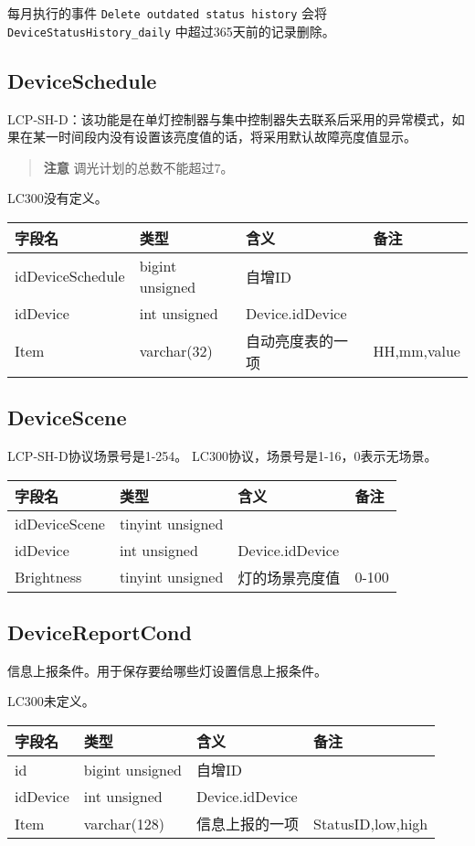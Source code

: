 每月执行的事件 \texttt{Delete outdated status history} 会将
\texttt{DeviceStatusHistory\_daily} 中超过365天前的记录删除。

\subsection{DeviceSchedule}\label{deviceschedule}

LCP-SH-D：该功能是在单灯控制器与集中控制器失去联系后采用的异常模式，如果在某一时间段内没有设置该亮度值的话，将采用默认故障亮度值显示。

\begin{quote}
\textbf{注意} 调光计划的总数不能超过7。
\end{quote}

LC300没有定义。

\begin{longtabu}[c]{@{}lXXX@{}}
\toprule
字段名 & 类型 & 含义 & 备注\tabularnewline
\midrule
\endhead
idDeviceSchedule & bigint unsigned & 自增ID &\tabularnewline
idDevice & int unsigned & Device.idDevice &\tabularnewline
Item & varchar(32) & 自动亮度表的一项 & HH,mm,value\tabularnewline
\bottomrule
\end{longtabu}

\subsection{DeviceScene}\label{devicescene}

LCP-SH-D协议场景号是1-254。 LC300协议，场景号是1-16，0表示无场景。

\begin{longtabu}[c]{@{}lXXX@{}}
\toprule
字段名 & 类型 & 含义 & 备注\tabularnewline
\midrule
\endhead
idDeviceScene & tinyint unsigned & &\tabularnewline
idDevice & int unsigned & Device.idDevice &\tabularnewline
Brightness & tinyint unsigned & 灯的场景亮度值 & 0-100\tabularnewline
\bottomrule
\end{longtabu}

\subsection{DeviceReportCond}\label{devicereportcond}

信息上报条件。用于保存要给哪些灯设置信息上报条件。

LC300未定义。

\begin{longtabu}[c]{@{}lXXX@{}}
\toprule
字段名 & 类型 & 含义 & 备注\tabularnewline
\midrule
\endhead
id & bigint unsigned & 自增ID &\tabularnewline
idDevice & int unsigned & Device.idDevice &\tabularnewline
Item & varchar(128) & 信息上报的一项 & StatusID,low,high\tabularnewline
\bottomrule
\end{longtabu}

